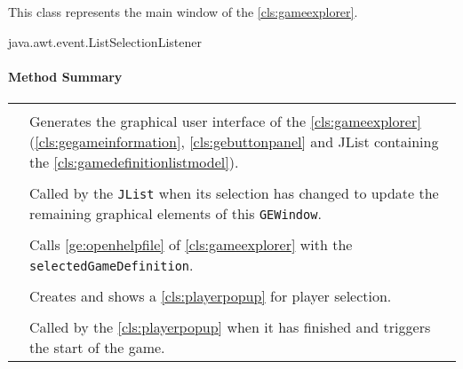 \pagebreak

This class represents the main window of the \ref{cls:gameexplorer}. \\


 java.awt.event.ListSelectionListener

\centerdash

\paragraph*{Method Summary}
\paragraph*{}
\begin{longtable}{Lp{10cm}}
	\startmethodtable
	 \\
	& Generates the graphical user interface of the \ref{cls:gameexplorer} (\ref{cls:gegameinformation}, \ref{cls:gebuttonpanel} and JList containing the \ref{cls:gamedefinitionlistmodel}). \\
	 \\
	& Called by the \texttt{JList} when its selection has changed to update the remaining graphical elements of this \texttt{GEWindow}. \\
	 \\
	& Calls \ref{ge:openhelpfile} of \ref{cls:gameexplorer} with the \texttt{selectedGameDefinition}. \\
	 \\
	& Creates and shows a \ref{cls:playerpopup} for player selection. \\
	 \\
	& Called by the \ref{cls:playerpopup} when it has finished and triggers the start of the game. \\
	\hline
\end{longtable}

\pagebreak

